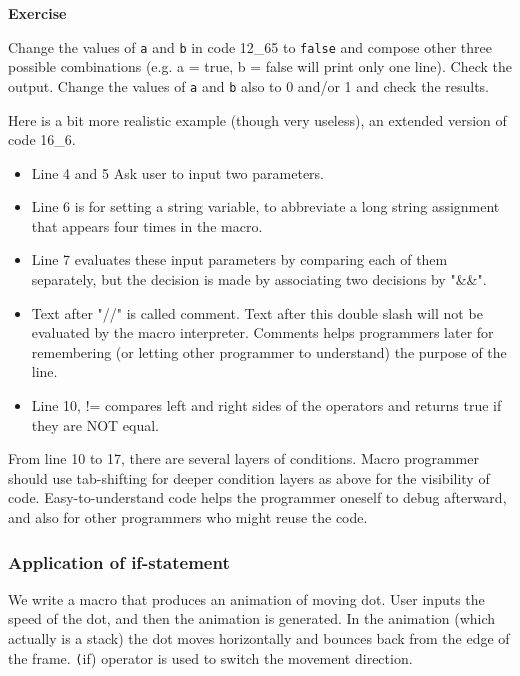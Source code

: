 \documentclass[11pt,a4paper,oneside]{report}
\newenvironment{indentexercise}[1]%
{{\setlength{\leftmargin}{2em}}%
\textbf{Exercise \thesubsection-#1}%
\begin{list}{}%
	\item%
}
{\end{list}}
\newcommand{\ilcom}[1]{\texttt{\small#1}}
\begin{document}
\begin{indentexercise}{1}
Change the values of \ilcom{a} and \ilcom{b} in code 12\_65 to \ilcom{false} and
compose other three possible combinations (e.g. a = true, b = false will print
only one line).
Check the output. Change the values of \ilcom{a} and \ilcom{b} also to 0 and/or
1 and check the results. 
\end{indentexercise}

Here is a bit more realistic example (though very useless), an extended version
of code 16\_6.

\begin{itemize}
\item Line 4 and 5 Ask user to input two parameters.
\item Line 6 is for setting a string variable, to abbreviate a long string assignment that appears four times in the macro.
\item Line 7 evaluates these input parameters by comparing each of them separately, but the decision is made by associating two decisions by "\&\&". 
\item Text after "//" is called comment. Text after this double slash will not be evaluated by the macro interpreter. Comments helps programmers later for remembering (or letting other programmer to understand) the purpose of the line. 
\item Line 10, != compares left and right sides of the operators and returns true if they are NOT equal.   
\end{itemize}
From line 10 to 17, there are several layers of conditions. Macro programmer should use tab-shifting for deeper condition layers as above for the visibility of code. Easy-to-understand code helps the programmer oneself to debug afterward, and also for other programmers who might reuse the code.
\subsubsection{Application of if-statement}
\label{sec:dotmove}

We write a macro that produces an animation of moving dot. User inputs the speed
of the dot, and then the animation is generated. In the animation (which
actually is a stack) the dot moves horizontally and bounces back from the edge
of the frame. \ilcom(if) operator is used to switch the movement direction.

\end{document}
